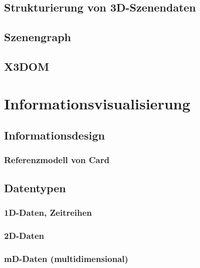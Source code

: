 \documentclass[a4paper, 11pt, accentcolor = tud3b]{tudreport}
\begin{document}
		\section{Strukturierung von 3D-Szenendaten} %

		\section{Szenengraph} %

		\section{X3DOM} %

	\chapter{Informationsvisualisierung} %

		\section{Informationsdesign} %

			\subsection{Referenzmodell von Card} %

		\section{Datentypen} %

			\subsection{1D-Daten, Zeitreihen} %

			\subsection{2D-Daten} %

			\subsection{mD-Daten (multidimensional)} %
\end{document}
